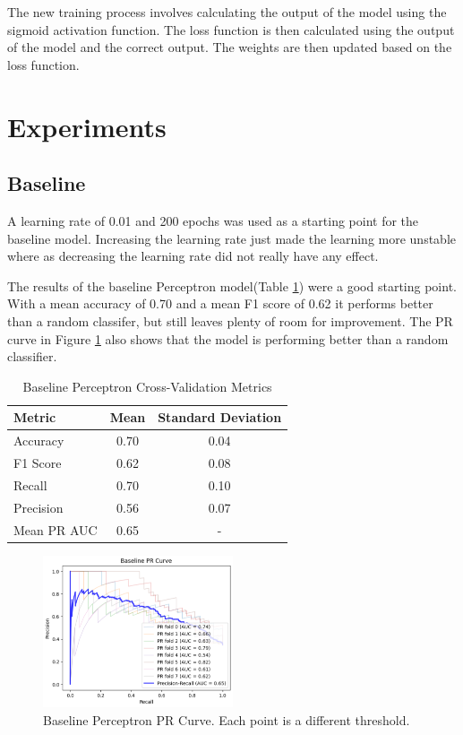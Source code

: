 The new training process involves calculating the output of the model using the sigmoid activation function. The loss function is then calculated using the output of the model and the correct output. The weights are then updated based on the loss function. 

\section{Experiments}

\subsection{Baseline}

A learning rate of 0.01 and 200 epochs was used as a starting point for the baseline model. Increasing the learning rate just made the learning more unstable where as decreasing the learning rate did not really have any effect.

The results of the baseline Perceptron model(Table \ref{tab:cv_metrics}) were a good starting point. With a mean accuracy of 0.70 and a mean F1 score of 0.62 it performs better than a random classifer, but still leaves plenty of room for improvement. The PR curve in Figure \ref{fig:baseline_pr} also shows that the model is performing better than a random classifier.

\begin{table}[ht!]
    \centering
    \begin{tabular}{lcc}
        \toprule
        \textbf{Metric} & \textbf{Mean} & \textbf{Standard Deviation} \\
        \midrule
        Accuracy & 0.70 & 0.04 \\
        F1 Score & 0.62 & 0.08 \\
        Recall & 0.70 & 0.10 \\
        Precision & 0.56 & 0.07 \\
        Mean PR AUC & 0.65 & - \\
        \bottomrule
    \end{tabular}
    \caption{Baseline Perceptron Cross-Validation Metrics}
    \label{tab:cv_metrics}
\end{table}

\begin{figure}[ht!]
    \centering
    \includegraphics[width=0.5\textwidth]{images/baseline_pr.png}
    \caption{Baseline Perceptron PR Curve. Each point is a different threshold.}
    \label{fig:baseline_pr}
\end{figure}


